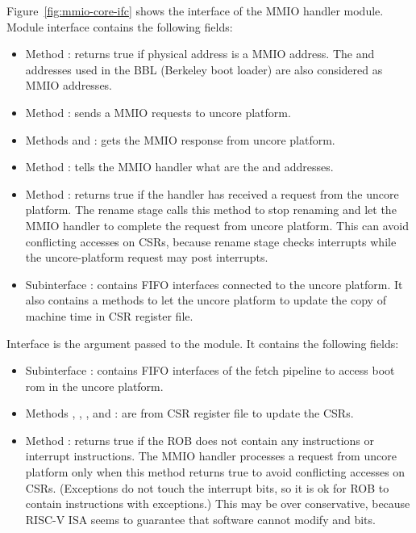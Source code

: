 Figure~\ref{fig:mmio-core-ifc} shows the interface of the MMIO handler module.
Module interface  contains the following fields:
\begin{itemize}
    \item Method : returns true if physical address  is a MMIO address.
    The  and  addresses used in the BBL (Berkeley boot loader) are also considered as MMIO addresses.
    \item Method : sends a MMIO requests to uncore platform.
    \item Methods  and : gets the MMIO response from uncore platform.
    \item Method : tells the MMIO handler what are the  and  addresses.
    \item Method : returns true if the handler has received a request from the uncore platform.
    The rename stage calls this method to stop renaming and let the MMIO handler to complete the request from uncore platform.
    This can avoid conflicting accesses on CSRs, because rename stage checks interrupts while the uncore-platform request may post interrupts.
    \item Subinterface : contains FIFO interfaces connected to the uncore platform.
    It also contains a  methods to let the uncore platform to update the copy of machine time in CSR register file.
\end{itemize}
Interface  is the argument passed  to the module.
It contains the following fields:
\begin{itemize}
    \item Subinterface : contains FIFO interfaces of the fetch pipeline to access boot rom in the uncore platform.
    \item Methods , , , and : are from CSR register file to update the CSRs.
    \item Method : returns true if the ROB  does not contain any  instructions or interrupt instructions.
    The MMIO handler processes a request from uncore platform only when this method returns true to avoid conflicting accesses on CSRs.
    (Exceptions do not touch the interrupt bits, so it is ok for ROB to contain instructions with exceptions.)
    This may be over conservative, because RISC-V ISA seems to guarantee that software cannot modify  and  bits.
\end{itemize}